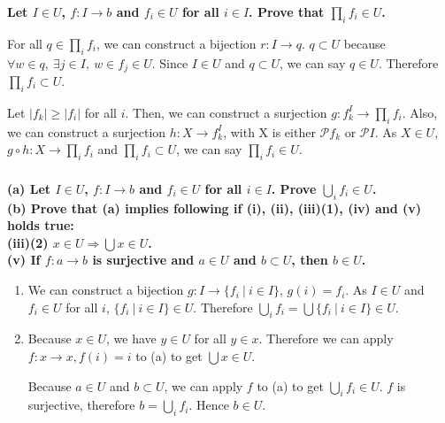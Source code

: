 \documentclass{article}
\begin{document}
\subsubsection{}

\textbf{Let $I \in U$, $f : I \rightarrow b $ and $f_i \in U$ for all $i \in I$. Prove that $\prod_i f_i \in U$.}

For all $q \in \prod_i f_i$, we can construct a bijection $r : I \rightarrow q$. $q \subset U$ because $\forall w \in q,\ \exists j \in I,\ w \in f_j \in U$. Since $I \in U$ and $q \subset U$, we can say $q \in U$. Therefore $\prod_i f_i \subset U$.

Let $|f_k| \geq |f_i|$ for all $i$. Then, we can construct a surjection $g : f_k^I \rightarrow \prod_i f_i$. Also, we can construct a surjection $h : X \rightarrow f_k^I$, with X is either $\mathcal{P} f_k$ or $\mathcal{P} I$. As $X \in U$, $g \circ h : X \rightarrow \prod_i f_i$ and $\prod_i f_i \subset U$, we can say $\prod_i f_i \in U$.

\subsubsection{}

\textbf{(a) Let $I \in U$, $f : I \rightarrow b $ and $f_i \in U$ for all $i \in I$. Prove $\bigcup_i f_i \in U$. \\ (b) Prove that (a) implies following if (i), (ii), (iii)(1), (iv) and (v) holds true: \\ \indent (iii)(2) $x \in U \Rightarrow \bigcup x \in U$. \\ \indent (v) If $f : a \rightarrow b$ is surjective and $a \in U$ and $b \subset U$, then $b \in U$.
}

\begin{enumerate}[label=(\alph*)]
\item We can construct a bijection $g :  I \rightarrow \{f_i\ |\ i \in I\}$, $g(i) = f_i$. As $I \in U$ and $f_i \in U$ for all $i$, $\{f_i\ |\ i \in I\} \in U$. Therefore $ \bigcup_i f_i = \bigcup \{f_i\ |\ i \in I\} \in U$.
\item Because $x \in U$, we have $y \in U$ for all $y \in x$. Therefore we can apply $f : x \rightarrow x, f(i) = i$ to (a) to get $\bigcup x \in U$.

Because $a \in U$ and $b \subset U$, we can apply $f$ to (a) to get $\bigcup_i f_i \in U$. $f$ is surjective, therefore $b = \bigcup_i f_i$. Hence $b \in U$.
\end{enumerate}
\end{document}
